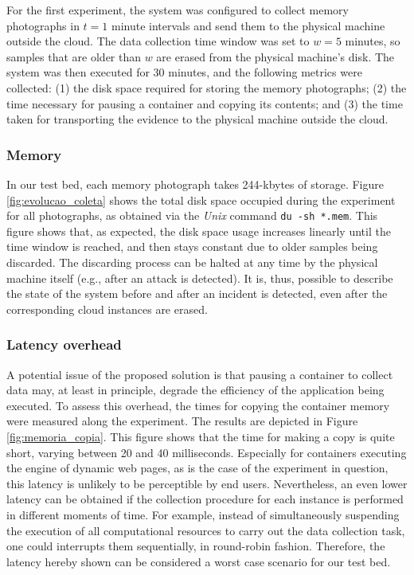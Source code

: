 \documentclass[twocolumn, notitlepage]{bmcart}%
\begin{document}
%
For the first experiment, the system was configured to collect memory photographs in $t=1$ minute intervals and send them to the physical machine outside the cloud.
%
The data collection time window was set to $w=5$ minutes, so samples that are older than $w$ are erased from the physical machine's disk.
%
The system was then executed for 30 minutes, and the following metrics were collected: 
(1) the disk space required for storing the memory photographs; 
(2) the time necessary for pausing a container and copying its contents; and 
(3) the time taken for transporting the evidence to the physical machine outside the cloud.

\subsubsection*{Memory}

In our test bed, each memory photograph takes 244-kbytes of storage.
%
Figure \ref{fig:evolucao_coleta} shows the total disk space occupied during the experiment for all photographs, as obtained via the \textit{Unix} command \texttt{du -sh *.mem}. 
%
This figure shows that, as expected, the disk space usage increases linearly until the time window is reached, and then stays constant due to older samples being discarded.
%
The discarding process can be halted at any time by the physical machine itself (e.g., after an attack is detected).
%
It is, thus, possible to describe the state of the system before and after an incident is detected, even after the corresponding cloud instances are erased.


\subsubsection*{Latency overhead}
A potential issue of the proposed solution is that pausing a container to collect data may, at least in principle, degrade the efficiency of the application being executed.
%
To assess this overhead, the times for copying the container memory were measured along the experiment.
%
The results are depicted in Figure \ref{fig:memoria_copia}.
%
This figure shows that the time for making a copy is quite short, varying between 20 and 40 milliseconds. 
%
Especially for containers executing the engine of dynamic web pages, as is the case of the experiment in question, this latency is unlikely to be perceptible by end users.
%
Nevertheless, an even lower latency can be obtained if the collection procedure for each instance is performed in different moments of time.
%
For example, instead of simultaneously suspending the execution of all computational resources to carry out the data collection task, one could interrupts them sequentially, in round-robin fashion.
%
Therefore, the latency hereby shown can be considered a worst case scenario for our test bed.
\end{document}
